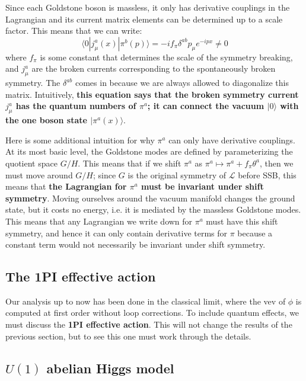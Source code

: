 \documentclass[11pt, oneside]{article}   	%
\theoremstyle{definition}
\numberwithin{equation}{subsection}		%
\begin{document}
Since each Goldstone boson is massless, it only has derivative couplings in the Lagrangian and its current matrix elements 
can be determined up to a scale factor. This means that we can write:
\begin{equation}
	\langle 0 | j_\mu^a(x) | \pi^b(p)\rangle = -i f_\pi \delta^{ab} p_\mu e^{-ipx}\neq 0
\end{equation}
where $f_\pi$ is some constant that determines the scale of the symmetry breaking, and $j_\mu^a$ are the broken currents 
corresponding to the spontaneously broken symmetry. The $\delta^{ab}$ comes in because we are always allowed to 
diagonalize this matrix. Intuitively, \textbf{this equation says that the broken symmetry current $j_\mu^a$ has the quantum numbers of 
$\pi^a$; it can connect the vacuum $| 0 \rangle$ with the one boson state $|\pi^a(x)\rangle$}. 

Here is some additional intuition for why $\pi^a$ can only have derivative couplings. At its most basic level, the Goldstone modes 
are defined by parameterizing the quotient space $G / H$. This means that if we shift $\pi^a$ as $\pi^a\mapsto \pi^a + f_\pi \theta^a$, 
then we must move around $G / H$; since $G$ is the original symmetry of $\mathcal L$ before SSB, this means that \textbf{the 
Lagrangian for $\pi^a$ must be invariant under shift symmetry}. Moving ourselves around the vacuum manifold changes the 
ground state, but it costs no energy, i.e. it is mediated by the massless Goldstone modes. This means that any Lagrangian we 
write down for $\pi^a$ must have this shift symmetry, and hence it can only contain derivative terms for $\pi$ because a 
constant term would not necessarily be invariant under shift symmetry.

\subsection{The 1PI effective action}

Our analysis up to now has been done in the classical limit, where the vev of $\phi$ is computed at first order without 
loop corrections. To include quantum effects, we must discuss the \textbf{1PI effective action}. This will not change the 
results of the previous section, but to see this one must work through the details. 

\subsection{$U(1)$ abelian Higgs model}
\end{document}

